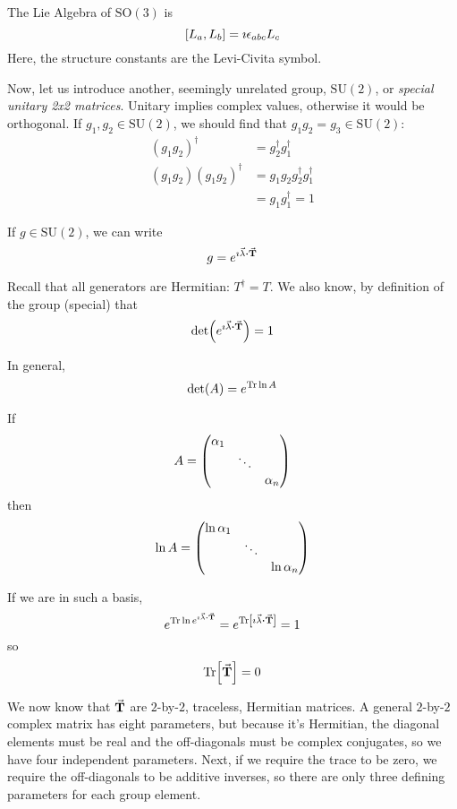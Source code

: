 \documentclass[a4paper,twoside,master.tex]{subfiles}
\begin{document}
The Lie Algebra of $ \text{SO}(3) $ is
\begin{equation}
    \comm{L_a}{L_b} = \imath \epsilon_{abc} L_c
\end{equation}
Here, the structure constants are the Levi-Civita symbol.

Now, let us introduce another, seemingly unrelated group, $ \text{SU}(2) $, or \textit{special unitary 2x2 matrices}. Unitary implies complex values, otherwise it would be orthogonal. If $ g_1, g_2 \in \text{SU}(2) $, we should find that $ g_1g_2 = g_3 \in \text{SU}(2) $:
\begin{align}
    (g_1 g_2)^\dagger &= g_2^\dagger g_1^\dagger \\
    (g_1 g_2)(g_1 g_2)^\dagger &= g_1 g_2 g_2^\dagger g_1^\dagger \\
    &= g_1 g_1^\dagger = 1
\end{align}

If $ g \in \text{SU}(2) $, we can write
\begin{equation}
    g = e^{\imath \va{\lambda} \vdot\va{ T}}
\end{equation}

Recall that all generators are Hermitian: $ T^\dagger = T $. We also know, by definition of the group (special) that
\begin{equation}
    \det(e^{\imath \va{\lambda} \vdot\va{ T}}) = 1
\end{equation}

In general,
\begin{equation}
    \det(A) = e^{\Tr \ln{A}}
\end{equation}

If
\begin{equation}
    A = \mqty(\dmat{\alpha_1, \ddots, \alpha_n})
\end{equation}
then
\begin{equation}
    \ln{A} = \mqty(\dmat{\ln{\alpha_1}, \ddots, \ln{\alpha_n}})
\end{equation}

If we are in such a basis,
\begin{equation}
    e^{\Tr \ln{e^{\imath \va{\lambda} \vdot\va{ T}}}} = e^{\Tr[\imath \va{\lambda} \vdot\va{ T}]} = 1
\end{equation}
so
\begin{equation}
    \Tr[\va{T}] = 0
\end{equation}

We now know that $\va{ T} $ are $ 2 $-by-$ 2 $, traceless, Hermitian matrices. A general $ 2 $-by-$ 2 $ complex matrix has eight parameters, but because it's Hermitian, the diagonal elements must be real and the off-diagonals must be complex conjugates, so we have four independent parameters. Next, if we require the trace to be zero, we require the off-diagonals to be additive inverses, so there are only three defining parameters for each group element.
\end{document}
